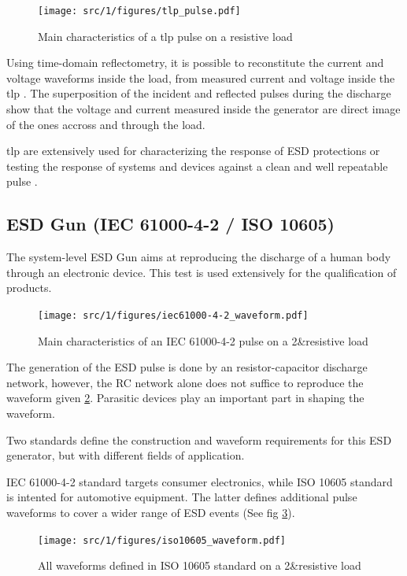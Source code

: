 \begin{figure}[h]
  \centering
  \texttt{[image: src/1/figures/tlp\_pulse.pdf]}
  \caption{Main characteristics of a \gls{tlp} pulse on a resistive load}
  \label{tlp_pulse}
\end{figure}

Using time-domain reflectometry, it is possible to reconstitute the current and voltage waveforms inside the load,
from measured current and voltage inside the \gls{tlp} \cite{TLP}.
The superposition of the incident and reflected pulses during the discharge show that the voltage and current
measured inside the generator are direct image of the ones accross and through the load.

\gls{tlp} are extensively used for characterizing the response of ESD protections \cite{TLPforESDProtectionCz}
or testing the response of systems and devices against a clean and well repeatable pulse \cite{TLPthroubleshooting, LacrampeTransientImmunity}.

\subsection{ESD Gun (IEC 61000-4-2 / ISO 10605)}
The system-level ESD Gun aims at reproducing the discharge of a human body through an electronic device.
This test is used extensively for the qualification of products.

\begin{figure}[h]
  \centering
  \texttt{[image: src/1/figures/iec61000-4-2\_waveform.pdf]}
  \caption{Main characteristics of an IEC 61000-4-2 pulse on a 2&\X\Omega resistive load}
  \label{iec_pulse}
\end{figure}

The generation of the ESD pulse is done by an resistor-capacitor discharge network, however, the RC network alone does not suffice to reproduce the waveform given \ref{iec_pulse}.
Parasitic devices play an important part in shaping the waveform.

Two standards define the construction and waveform requirements for this ESD generator, but with different fields of application.

IEC 61000-4-2\cite{iec61000-4-2} standard targets consumer electronics, while ISO 10605\cite{iso10605} standard is intented for automotive equipment.
The latter defines additional pulse waveforms to cover a wider range of ESD events (See fig \ref{iso_pulse}).

\begin{figure}[h]
  \centering
  \texttt{[image: src/1/figures/iso10605\_waveform.pdf]}
  \caption{All waveforms defined in ISO 10605 standard on a 2&\X\Omega resistive load}
  \label{iso_pulse}
\end{figure}


